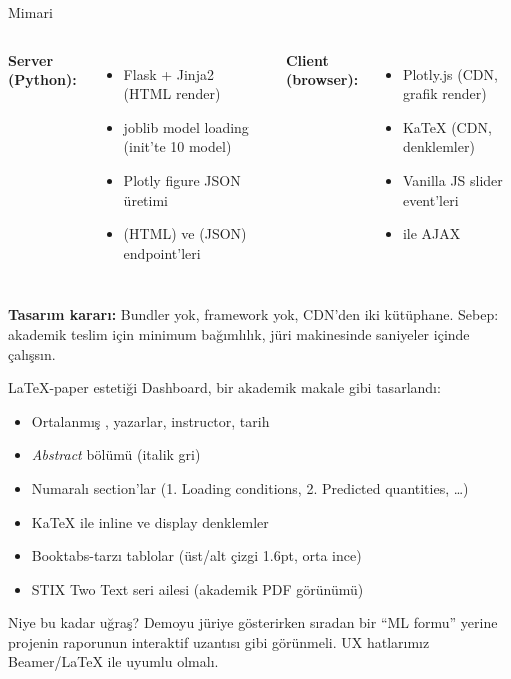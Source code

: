 \begin{frame}{Mimari}
  \begin{columns}[T,onlytextwidth]
    \textbf{Server (Python):}
    \begin{itemize}\small
      \item Flask + Jinja2 (HTML render)
      \item joblib model loading (init'te 10 model)
      \item Plotly figure JSON üretimi
      \item \code{/} (HTML) ve  (JSON) endpoint'leri
    \end{itemize}
    \textbf{Client (browser):}
    \begin{itemize}\small
      \item Plotly.js (CDN, grafik render)
      \item KaTeX (CDN, denklemler)
      \item Vanilla JS slider event'leri
      \item {} ile AJAX
    \end{itemize}
  \end{columns}

  \vspace{0.5cm}
  \textbf{Tasarım kararı:} Bundler yok, framework yok, CDN'den iki kütüphane.
  Sebep: akademik teslim için \alert{minimum bağımlılık}, jüri makinesinde
  saniyeler içinde çalışsın.
\end{frame}

\begin{frame}{LaTeX-paper estetiği}
  Dashboard, bir akademik makale gibi tasarlandı:
  \begin{itemize}\small
    \item Ortalanmış , yazarlar, instructor, tarih
    \item \emph{Abstract} bölümü (italik gri)
    \item Numaralı section'lar (1. Loading conditions, 2. Predicted quantities, \ldots)
    \item KaTeX ile inline ve display denklemler
    \item Booktabs-tarzı tablolar (üst/alt çizgi 1.6pt, orta ince)
    \item STIX Two Text seri ailesi (akademik PDF görünümü)
  \end{itemize}

  \vspace{0.4cm}
  \begin{block}{Niye bu kadar uğraş?}
    \footnotesize
    Demoyu jüriye gösterirken sıradan bir ``ML formu'' yerine projenin
    raporunun \alert{interaktif uzantısı} gibi görünmeli. UX hatlarımız
    Beamer/LaTeX ile uyumlu olmalı.
  \end{block}
\end{frame}

